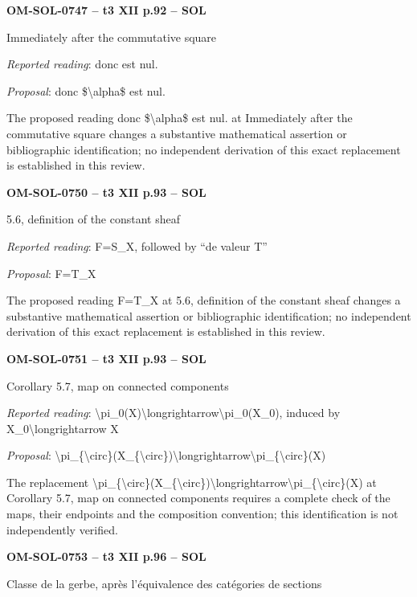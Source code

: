 \par\noindent\textbf{OM-SOL-0747 -- t3 XII p.92 -- SOL}\par
Immediately after the commutative square\par
\emph{Reported reading}: donc est nul.\par
\emph{Proposal}: donc \$\textbackslash{}alpha\$ est nul.\par
The proposed reading donc \$\textbackslash{}alpha\$ est nul. at Immediately after the commutative square changes a substantive mathematical assertion or bibliographic identification; no independent derivation of this exact replacement is established in this review.\par
\par\noindent\textbf{OM-SOL-0750 -- t3 XII p.93 -- SOL}\par
5.6, definition of the constant sheaf\par
\emph{Reported reading}: F=\allowbreak S\_X, followed by “de valeur T”\par
\emph{Proposal}: F=\allowbreak T\_X\par
The proposed reading F=\allowbreak T\_X at 5.6, definition of the constant sheaf changes a substantive mathematical assertion or bibliographic identification; no independent derivation of this exact replacement is established in this review.\par
\par\noindent\textbf{OM-SOL-0751 -- t3 XII p.93 -- SOL}\par
Corollary 5.7, map on connected components\par
\emph{Reported reading}: \textbackslash{}pi\_0(X)\textbackslash{}longrightarrow\textbackslash{}pi\_0(X\_0), induced by X\_0\textbackslash{}longrightarrow X\par
\emph{Proposal}: \textbackslash{}pi\_\{\textbackslash{}circ\}(X\_\{\textbackslash{}circ\})\textbackslash{}longrightarrow\textbackslash{}pi\_\{\textbackslash{}circ\}(X)\par
The replacement \textbackslash{}pi\_\{\textbackslash{}circ\}(X\_\{\textbackslash{}circ\})\textbackslash{}longrightarrow\textbackslash{}pi\_\{\textbackslash{}circ\}(X) at Corollary 5.7, map on connected components requires a complete check of the maps, their endpoints and the composition convention; this identification is not independently verified.\par
\par\noindent\textbf{OM-SOL-0753 -- t3 XII p.96 -- SOL}\par
Classe de la gerbe, après l'équivalence des catégories de sections\par
